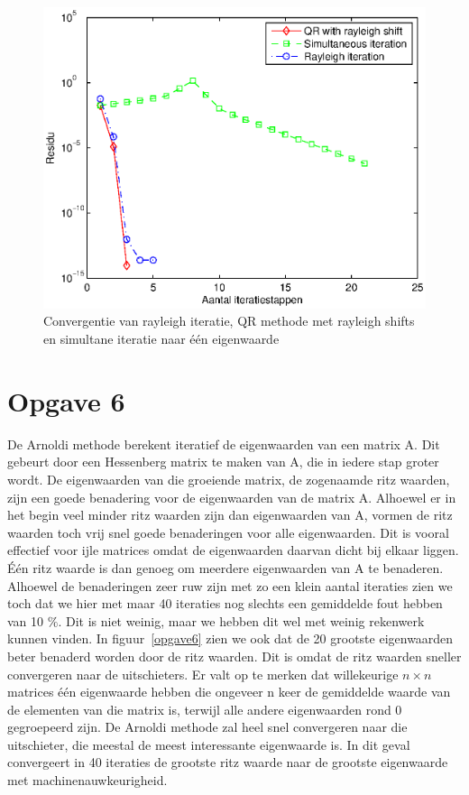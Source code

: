 \documentclass[]{article}
\newcommand{\opgave}[1]{\pagebreak\section*{Opgave #1}}
\begin{document}
\begin{figure}[h]
\noindent \includegraphics[width=1\linewidth]{opgave5.eps}
\caption{Convergentie van rayleigh iteratie, QR methode met rayleigh shifts en simultane iteratie naar \'{e}\'{e}n eigenwaarde}
\label{opgave5}
\end{figure}

\opgave{6}

De Arnoldi methode berekent iteratief de eigenwaarden van een matrix A. Dit gebeurt door een Hessenberg matrix te maken van A, die in iedere stap groter wordt. De eigenwaarden van die groeiende matrix, de zogenaamde ritz waarden, zijn een goede benadering voor de eigenwaarden van de matrix A. Alhoewel er in het begin veel minder ritz waarden zijn dan eigenwaarden van A, vormen de ritz waarden toch vrij snel goede benaderingen voor alle eigenwaarden. Dit is vooral effectief voor ijle matrices omdat de eigenwaarden daarvan dicht bij elkaar liggen. \'{E}\'{e}n ritz waarde is dan genoeg om meerdere eigenwaarden van A te benaderen. Alhoewel de benaderingen zeer ruw zijn met zo een klein aantal iteraties zien we toch dat we hier met maar 40 iteraties nog slechts een gemiddelde fout hebben van 10 $\%$. Dit is niet weinig, maar we hebben dit wel met weinig rekenwerk kunnen vinden. In figuur~\ref{opgave6} zien we ook dat de 20 grootste eigenwaarden beter benaderd worden door de ritz waarden. Dit is omdat de ritz waarden sneller convergeren naar de uitschieters. 
\linebreak Er valt op te merken dat willekeurige $n\times n$ matrices \'{e}\'{e}n eigenwaarde hebben die ongeveer n keer de gemiddelde waarde van de elementen van die matrix is, terwijl alle andere eigenwaarden rond 0 gegroepeerd zijn. De Arnoldi methode zal heel snel convergeren naar die uitschieter, die meestal de meest interessante eigenwaarde is. In dit geval convergeert in 40 iteraties de grootste ritz waarde naar de grootste eigenwaarde met machinenauwkeurigheid.
\end{document}
